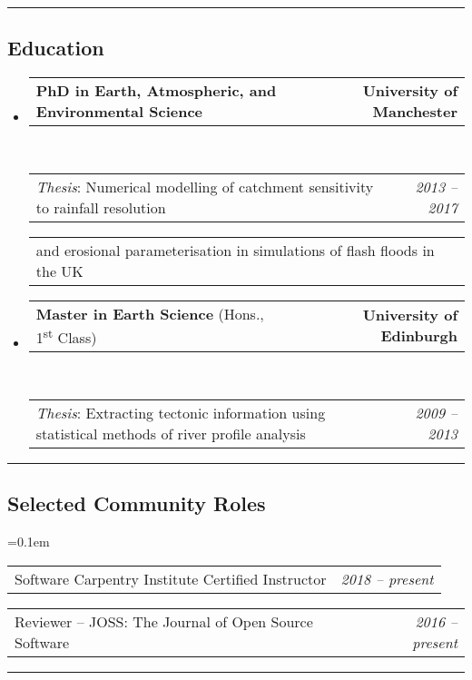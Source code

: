 \documentclass[10.5pt,a4]{article}
\makeatletter
\newcommand{\headerrow}[2]
{\begin{tabular*}{\linewidth}{l@{\extracolsep{\fill}}r}
	#1 &
	#2 \\
\end{tabular*}}
\makeatother
\begin{document}
\hrule
\vspace{-0.4em}
\subsection*{Education}
\begin{itemize}
	\parskip=0.1em
	
	\item 
	\headerrow
		{\textbf{PhD in Earth, Atmospheric, and Environmental Science}}
		{\textbf{University of Manchester}}
	\\
	\headerrow
		{\emph{Thesis}: Numerical modelling of catchment sensitivity to rainfall resolution}
		{\emph{2013 -- 2017}}
	\headerrow
		{\hspace{10mm} and erosional parameterisation in simulations of flash floods in the UK}
		{}
  
	\item 
	\headerrow
		{\textbf{Master in Earth Science} (Hons., 1\textsuperscript{st} Class) }
		{\textbf{University of Edinburgh}}
	\\
	\headerrow
		{\emph{Thesis}: Extracting tectonic information using statistical methods of river profile analysis}
		{\emph{2009 -- 2013}}
\end{itemize}

\hrule
\vspace{-0.4em}
\subsection*{Selected Community Roles}
	\parskip=0.1em
\begin{itemize*}
	\item
	\headerrow
	  {Software Carpentry Institute Certified Instructor}
	  {\textit{2018 -- present}}
	  
	\item
	\headerrow
	  {Reviewer -- JOSS: The Journal of Open Source Software}
	  {\textit{2016 -- present}}

\end{itemize*}

\hrule
\vspace{-0.4em}
\end{document}
